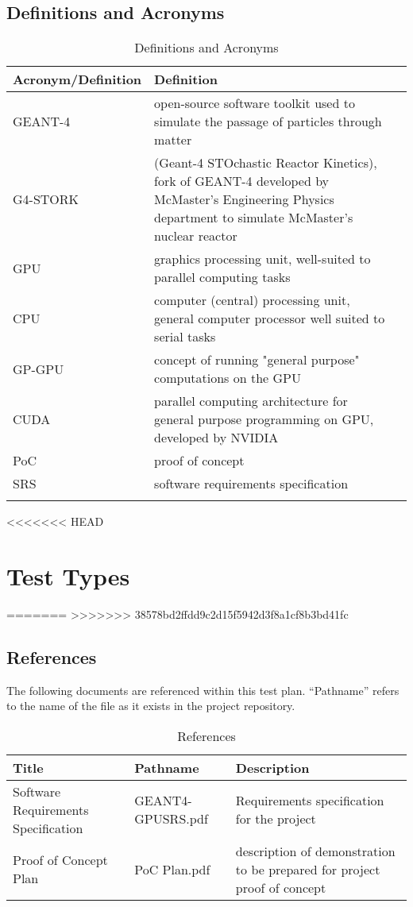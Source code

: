 \documentclass[12pt]{article}
\begin{document}
\subsection{Definitions and Acronyms} %
\begin{table}[h]
\centering
\caption{Definitions and Acronyms}
\begin{tabular}{|l|l|l|}
\Xhline{2\arrayrulewidth}
\bf Acronym/Definition & \bf Definition\\\hline
GEANT-4 & open-source software toolkit used to simulate the passage of particles through matter\\
G4-STORK & (Geant-4 STOchastic Reactor Kinetics), fork of GEANT-4 developed by McMaster's Engineering Physics department to simulate McMaster's nuclear reactor\\
GPU & graphics processing unit, well-suited to parallel computing tasks\\
CPU & computer (central) processing unit, general computer processor well suited to serial tasks\\
GP-GPU & concept of running "general purpose" computations on the GPU\\
CUDA & parallel computing architecture for general purpose programming on GPU, developed by NVIDIA\\
PoC & proof of concept\\
SRS & software requirements specification\\
\Xhline{2\arrayrulewidth}
\end{tabular}
\end{table}
<<<<<<< HEAD

\section{Test Types}

=======
>>>>>>> 38578bd2ffdd9c2d15f5942d3f8a1cf8b3bd41fc
\subsection{References}
The following documents are referenced within this test plan. ``Pathname'' refers to the name of the file as it exists in the project repository.
\begin{table}[h]
\centering
\caption{References}\label{Table_References}
\begin{tabular}{>{\raggedright\arraybackslash}p{}>{\raggedright\arraybackslash}p{}>{\raggedright\arraybackslash}p{}}
\toprule
\bf Title & \bf Pathname & \bf Description\\\midrule
Software Requirements Specification & GEANT4-GPUSRS.pdf & Requirements specification for the project\\
Proof of Concept Plan & PoC Plan.pdf & description of demonstration to be prepared for project proof of concept\\
\bottomrule
\end{tabular}
\end{table}
\end{document}
